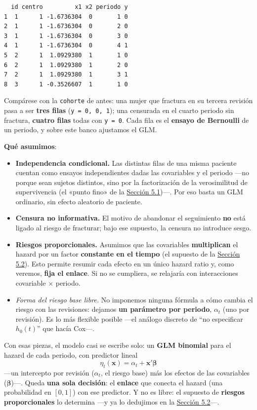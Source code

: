 \documentclass[
  letterpaper,
  DIV=11,
  numbers=noendperiod]{scrartcl}
\providecommand{\tightlist}{%
  \setlength{\itemsep}{0pt}\setlength{\parskip}{0pt}}\usepackage{longtable,booktabs,array}
\begin{document}
\begin{verbatim}
  id centro         x1 x2 periodo y
1  1      1 -1.6736304  0       1 0
2  1      1 -1.6736304  0       2 0
3  1      1 -1.6736304  0       3 0
4  1      1 -1.6736304  0       4 1
5  2      1  1.0929380  1       1 0
6  2      1  1.0929380  1       2 0
7  2      1  1.0929380  1       3 1
8  3      1 -0.3526607  1       1 0
\end{verbatim}

Compárese con la \texttt{cohorte} de antes: una mujer que fractura en su
tercera revisión pasa a ser \textbf{tres filas}
(\texttt{y\ =\ 0,\ 0,\ 1}); una censurada en el cuarto periodo sin
fractura, \textbf{cuatro filas} todas con \texttt{y\ =\ 0}. Cada fila es
el \textbf{ensayo de Bernoulli} de un periodo, y sobre este banco
ajustamos el GLM.

\textbf{Qué asumimos}:

\begin{itemize}
\tightlist
\item
  \textbf{Independencia condicional.} Las distintas filas de una misma
  paciente cuentan como ensayos independientes dadas las covariables y
  el periodo ---no porque sean sujetos distintos, sino por la
  factorización de la verosimilitud de supervivencia (el «punto fino» de
  la \protect\hyperlink{sec-u15-hazard}{Sección 5.1})---. Por eso basta
  un GLM ordinario, sin efecto aleatorio de paciente.
\item
  \textbf{Censura no informativa.} El motivo de abandonar el seguimiento
  \textbf{no} está ligado al riesgo de fracturar; bajo ese supuesto, la
  censura no introduce sesgo.
\item
  \textbf{Riesgos proporcionales.} Asumimos que las covariables
  \textbf{multiplican} el hazard por un factor \textbf{constante en el
  tiempo} (el supuesto de la \protect\hyperlink{sec-u15-ph}{Sección
  5.2}). Esto permite resumir cada efecto en un único hazard ratio y,
  como veremos, \textbf{fija el enlace}. Si no se cumpliera, se
  relajaría con interacciones covariable × periodo.
\item
  \emph{Forma del riesgo base libre.} No imponemos ninguna fórmula a
  cómo cambia el riesgo con las revisiones: dejamos \textbf{un parámetro
  por periodo}, \(\alpha_t\) (uno por revisión). Es lo más flexible
  posible ---el análogo discreto de ``no especificar \(h_0(t)\)'' que
  hacía Cox---.
\end{itemize}

Con esas piezas, el modelo casi se escribe solo: un \textbf{GLM
binomial} para el hazard de cada periodo, con predictor lineal \[
\eta_t(\mathbf{x})=\alpha_t+\mathbf{x}'\boldsymbol\beta
\] ---un intercepto por revisión (\(\alpha_t\), el riesgo base) más los
efectos de las covariables (\(\boldsymbol\beta\))---. Queda \textbf{una
sola decisión}: el \textbf{enlace} que conecta el hazard (una
probabilidad en \([0,1]\)) con ese predictor. Y no es libre: el supuesto
de \textbf{riesgos proporcionales} lo determina ---y ya lo dedujimos en
la \protect\hyperlink{sec-u15-prop}{Sección 5.2}---.
\end{document}
